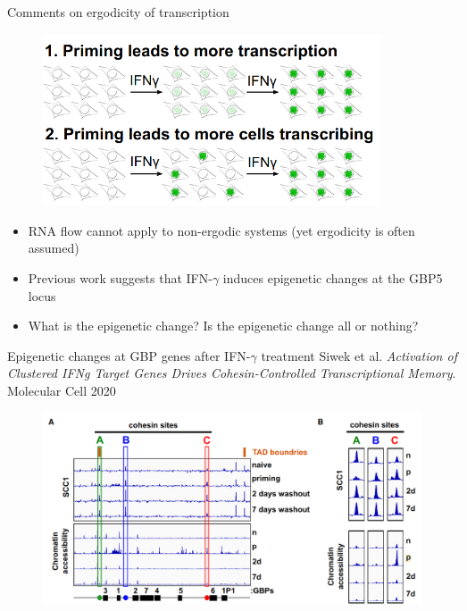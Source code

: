 \documentclass[aspectratio=1610]{beamer}					%
\begin{document}
\begin{frame}{Comments on ergodicity of transcription}
\begin{figure}
\includegraphics[width=10cm]{Ergodic.png}
\end{figure}
\begin{itemize}
\item RNA flow cannot apply to non-ergodic systems (yet ergodicity is often assumed)
\item Previous work suggests that IFN-$\gamma$ induces epigenetic changes at the GBP5 locus
\item What is the epigenetic change? Is the epigenetic change all or nothing?
\end{itemize}
\vspace{0.1in}


\end{frame}

\begin{frame}{Epigenetic changes at GBP genes after IFN-$\gamma$ treatment}
Siwek et al. \textit{Activation of Clustered IFNg Target Genes Drives Cohesin-Controlled Transcriptional Memory}. Molecular Cell 2020
\begin{figure}
\includegraphics[width=12cm]{Epigenetic.png}
\end{figure}
\end{frame}
\end{document}

